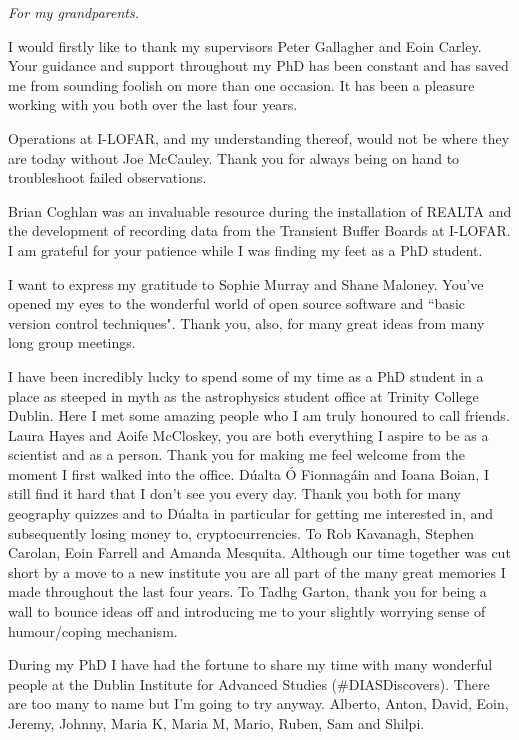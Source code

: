 
\begin{dedication}
\textit{For my grandparents.}
\end{dedication}

\begin{acknowledgements}
I would firstly like to thank my supervisors Peter Gallagher and Eoin Carley. Your guidance and support throughout my PhD has been constant and has saved me from sounding foolish on more than one occasion. It has been a pleasure working with you both over the last four years.

Operations at I-LOFAR, and my understanding thereof, would not be where they are today without Joe McCauley. Thank you for always being on hand to troubleshoot failed observations.

Brian Coghlan was an invaluable resource during the installation of REALTA and the development of recording data from the Transient Buffer Boards at I-LOFAR. I am grateful for your patience while I was finding my feet as a PhD student. 

I want to express my gratitude to Sophie Murray and Shane Maloney. You've opened my eyes to the wonderful world of open source software and ``basic version control techniques". Thank you, also, for many great ideas from many long group meetings.

I have been incredibly lucky to spend some of my time as a PhD student in a place as steeped in myth as the astrophysics student office at Trinity College Dublin. Here I met some amazing people who I am truly honoured to call friends. Laura Hayes and Aoife McCloskey, you are both everything I aspire to be as a scientist and as a person. Thank you for making me feel welcome from the moment I first walked into the office.
D\'ualta \'O Fionnag\'ain and Ioana Boian, I still find it hard that I don't see you every day. Thank you both for many geography quizzes and to D\'ualta in particular for getting me interested in, and subsequently losing money to, cryptocurrencies.
To Rob Kavanagh, Stephen Carolan, Eoin Farrell and Amanda Mesquita. Although our time together was cut short by a move to a new institute you are all part of the many great memories I made throughout the last four years.
To Tadhg Garton, thank you for being a wall to bounce ideas off and introducing me to your slightly worrying sense of humour/coping mechanism.

During my PhD I have had the fortune to share my time with many wonderful people at the Dublin Institute for Advanced Studies (\#DIASDiscovers). There are too many to name but I'm going to try anyway. Alberto, Anton, David, Eoin, Jeremy, Johnny, Maria K, Maria M, Mario, Ruben, Sam and Shilpi.


\end{acknowledgements}
